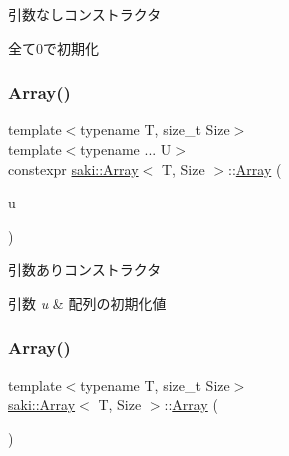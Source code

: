 引数なしコンストラクタ 

全て0で初期化 \mbox{\label{classsaki_1_1_array_a74ecc29a94531923c38471eec411d652}} 
\subsubsection{\texorpdfstring{Array()}{Array()}\hspace{0.1cm}{\footnotesize\ttfamily [2/4]}}
{\footnotesize\ttfamily template$<$typename T, size\+\_\+t Size$>$ \\
template$<$typename ... U$>$ \\
constexpr \mbox{\hyperlink{classsaki_1_1_array}{saki\+::\+Array}}$<$ T, Size $>$\+::\mbox{\hyperlink{classsaki_1_1_array}{Array}} (\begin{DoxyParamCaption}\item[{const U \&...}]{u }\end{DoxyParamCaption})\hspace{0.3cm}{\ttfamily [inline]}}



引数ありコンストラクタ 


\begin{DoxyParams}{引数}
{\em u} & 配列の初期化値 \\
\hline
\end{DoxyParams}
\mbox{\label{classsaki_1_1_array_ad556a6929d862c01d46ea34c7b7f148a}} 
\subsubsection{\texorpdfstring{Array()}{Array()}\hspace{0.1cm}{\footnotesize\ttfamily [3/4]}}
{\footnotesize\ttfamily template$<$typename T, size\+\_\+t Size$>$ \\
\mbox{\hyperlink{classsaki_1_1_array}{saki\+::\+Array}}$<$ T, Size $>$\+::\mbox{\hyperlink{classsaki_1_1_array}{Array}} (\begin{DoxyParamCaption}\item[{const \mbox{\hyperlink{classsaki_1_1_array}{Array}}$<$ T, Size $>$ \&}]{ }\end{DoxyParamCaption})\hspace{0.3cm}{\ttfamily [default]}}

